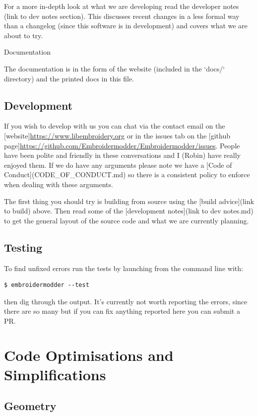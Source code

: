 \documentclass{report}
\begin{document}
For a more in-depth look at what we are developing read the developer notes (link to dev notes section). This discusses recent changes in a less formal way than a changelog (since this software is in development) and covers what we are about to try.

Documentation

The documentation is in the form of the website (included in the `docs/`
directory) and the printed docs in this file.

\subsection{Development}

If you wish to develop with us you can chat via the contact email
on the [website]\url{https://www.libembroidery.org} or in the issues tab on the
[github page]\url{https://github.com/Embroidermodder/Embroidermodder/issues}.
People have been polite and friendly in these conversations and I (Robin)
have really enjoyed them.
If we do have any arguments please note we have a
[Code of Conduct](CODE\_OF\_CONDUCT.md) so there is a consistent policy to
enforce when dealing with these arguments.

The first thing you should try is building from source using the [build advice](link to build)
above. Then read some of the [development notes](link to dev notes.md) to get the general
layout of the source code and what we are currently planning.

\subsection{Testing}

To find unfixed errors run the tests by launching from the command line with:

\begin{lstlisting}
$ embroidermodder --test
\end{lstlisting}

then dig through the output. It's currently not worth reporting the errors, since
there are so many but if you can fix anything reported here you can submit a PR.

\section{Code Optimisations and Simplifications}

\subsection{Geometry}
\end{document}
